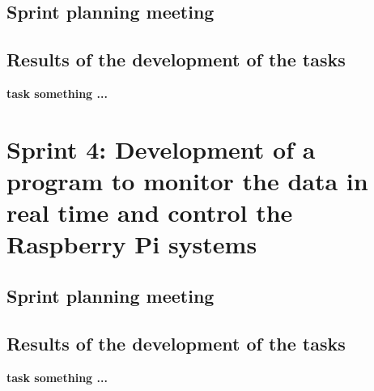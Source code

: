 \subsection{Sprint planning meeting}



\subsection{Results of the development of the tasks}
\textbf{task something ...}



\section{Sprint 4: Development of a program to monitor the data in real time and control the Raspberry Pi systems}

\subsection{Sprint planning meeting}



\subsection{Results of the development of the tasks}
\textbf{task something ...}




